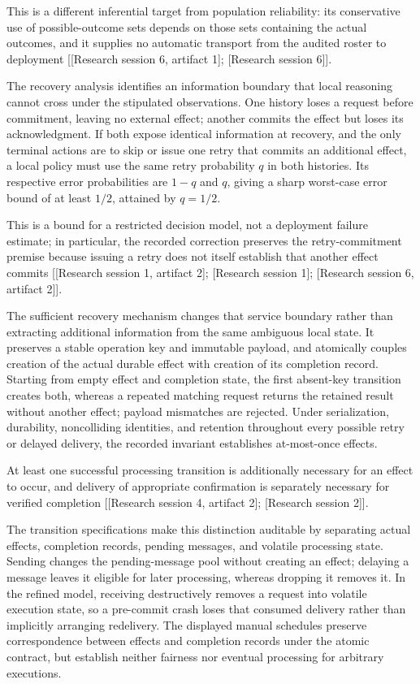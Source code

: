 \documentclass[11pt]{article}
\begin{document}
This is a different inferential target from population reliability: its conservative use of possible-outcome sets depends on those sets containing the actual outcomes, and it supplies no automatic transport from the audited roster to deployment [[Research session 6, artifact 1]; [Research session 6]].

The recovery analysis identifies an information boundary that local reasoning cannot cross under the stipulated observations. One history loses a request before commitment, leaving no external effect; another commits the effect but loses its acknowledgment. If both expose identical information at recovery, and the only terminal actions are to skip or issue one retry that commits an additional effect, a local policy must use the same retry probability $q$ in both histories. Its respective error probabilities are $1-q$ and $q$, giving a sharp worst-case error bound of at least $1/2$, attained by $q=1/2$.

This is a bound for a restricted decision model, not a deployment failure estimate; in particular, the recorded correction preserves the retry-commitment premise because issuing a retry does not itself establish that another effect commits [[Research session 1, artifact 2]; [Research session 1]; [Research session 6, artifact 2]].

The sufficient recovery mechanism changes that service boundary rather than extracting additional information from the same ambiguous local state. It preserves a stable operation key and immutable payload, and atomically couples creation of the actual durable effect with creation of its completion record. Starting from empty effect and completion state, the first absent-key transition creates both, whereas a repeated matching request returns the retained result without another effect; payload mismatches are rejected. Under serialization, durability, noncolliding identities, and retention throughout every possible retry or delayed delivery, the recorded invariant establishes at-most-once effects.

At least one successful processing transition is additionally necessary for an effect to occur, and delivery of appropriate confirmation is separately necessary for verified completion [[Research session 4, artifact 2]; [Research session 2]].

The transition specifications make this distinction auditable by separating actual effects, completion records, pending messages, and volatile processing state. Sending changes the pending-message pool without creating an effect; delaying a message leaves it eligible for later processing, whereas dropping it removes it. In the refined model, receiving destructively removes a request into volatile execution state, so a pre-commit crash loses that consumed delivery rather than implicitly arranging redelivery. The displayed manual schedules preserve correspondence between effects and completion records under the atomic contract, but establish neither fairness nor eventual processing for arbitrary executions.
\end{document}
